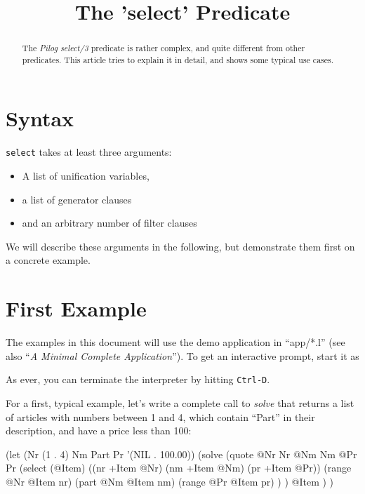 \title{The 'select' Predicate}

\maketitle

\begin{abstract}
  The \emph{Pilog} \emph{select/3} predicate is rather complex, and
  quite different from other predicates. This article tries to
  explain it in detail, and shows some typical use cases.
\end{abstract}

\section{Syntax}
\label{sec:select-pred-syntax}

\texttt{select} takes at least three arguments:

\begin{itemize}
\item A list of unification variables,
\item a list of generator clauses
\item and an arbitrary number of filter clauses
\end{itemize}

We will describe these arguments in the following, but demonstrate them
first on a concrete example.

 
\section{First Example}
\label{sec:select-pred-first-example}


The examples in this document will use the demo application in ``app/*.l''
(see also ``\emph{A Minimal Complete Application}''). To get
an interactive prompt, start it as



As ever, you can terminate the interpreter by hitting \texttt{Ctrl-D}.

For a first, typical example, let's write a complete call to
\emph{solve} that returns a list of articles with numbers
between 1 and 4, which contain ``Part'' in their description, and have a
price less than 100:


\begin{wideverbatim}
(let (Nr (1 . 4)  Nm Part  Pr '(NIL . 100.00))
   (solve
      (quote
         @Nr Nr
         @Nm Nm
         @Pr Pr
         (select (@Item)
            ((nr +Item @Nr) (nm +Item @Nm) (pr +Item @Pr))
               (range @Nr @Item nr)
               (part @Nm @Item nm)
               (range @Pr @Item pr) ) )
      @Item ) )
\end{wideverbatim}

